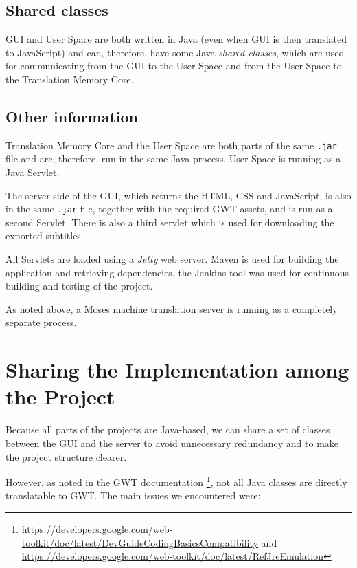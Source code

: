 \subsection*{Shared classes}

GUI and User Space are both written in Java (even when GUI is then translated to JavaScript) and can, therefore, have some Java \emph{shared classes}, which are used for communicating from the GUI to the User Space and from the User Space to the Translation Memory Core.


\subsection*{Other information}

Translation Memory Core and the User Space are both parts of the same \texttt{.jar} file and are, therefore, run in the same Java process. User Space is running as a Java Servlet.

The server side of the GUI, which returns the HTML, CSS and JavaScript, is also in the same \texttt{.jar} file, together with the required GWT assets, and is run as a second Servlet. There is also a third servlet which is used for downloading the exported subtitles.

All Servlets are loaded using a \emph{Jetty} web server. Maven is used for building the application and retrieving dependencies, the Jenkins tool was used for continuous building and testing of the project.

As noted above, a Moses machine translation server is running as a completely separate process.


\section{Sharing the Implementation among the Project}

Because all parts of the projects are Java-based, we can share a set of classes between the GUI and the server to avoid unnecessary redundancy and to make the project structure clearer.

However, as noted in the GWT documentation \footnote{\url{https://developers.google.com/web-toolkit/doc/latest/DevGuideCodingBasicsCompatibility} and \url{https://developers.google.com/web-toolkit/doc/latest/RefJreEmulation}}, not all Java classes are directly translatable to GWT. The main issues we encountered were:

